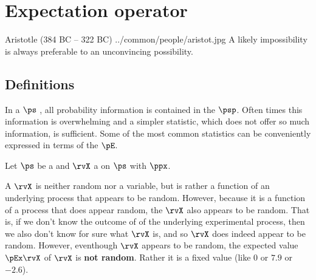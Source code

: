 \chapter{Expectation operator}
\label{chp:stats}
\qboxnps
  {Aristotle (384 BC -- 322 BC)
    \footnotemark
  }
  {../common/people/aristot.jpg}
  {A likely impossibility is always preferable to an
  unconvincing possibility.}
\section{Definitions}
\label{sec:pE_defs}
In a  $\ps$ , all probability information
is contained in the  $\psp$.
Often times this information is overwhelming and a simpler statistic,
which does not offer so much information, is sufficient.
Some of the most common statistics can be conveniently expressed in terms
of the  $\pE$.
\begin{definition}
\label{def:pE}
Let $\ps$ be a   and
$\rvX$ a   on $\ps$ with
 $\ppx$.
\end{definition}

A  $\rvX$ is neither random nor a variable,
but is rather a function of an underlying process that appears to be random.
However, because it is a function of a process that does appear random,
the  $\rvX$ also appears to be random.
That is, if we don't know the outcome of of the underlying experimental
process, then we also don't know for sure what $\rvX$ is, and so $\rvX$ does
indeed appear to be random.
However, eventhough $\rvX$ appears to be random,
the expected value $\pEx\rvX$  of $\rvX$ is {\bf not random}.
Rather it is a fixed value (like $0$ or $7.9$ or $-2.6$).

